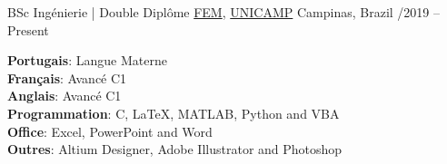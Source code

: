 \documentclass[10pt, a4paper]{extarticle}
\begin{document}
\headedsection
    {BSc Ingénierie | Double Diplôme}
    {\textsc{}}
    {
        \headedsubsection
        {\href{https://www.fem.unicamp.br/index.php/pt-br/}{FEM}, \href{https://www.unicamp.br/unicamp/universidade}{UNICAMP}}
        {Campinas, Brazil /2019 -- Present}
        {}
    }


\vspace{6mm}
\begin{multicols}{2}
    \vspace{2mm}
    \textbf{Portugais}: Langue Materne\\
    \textbf{Français}: Avancé C1\\
    \textbf{Anglais}: Avancé C1\\
    \columnbreak
    \vspace{2mm}
    \textbf{Programmation}: C, LaTeX, MATLAB, Python and VBA\\
    \textbf{Office}: Excel, PowerPoint and Word\\
    \textbf{Outres}: Altium Designer, Adobe Illustrator and Photoshop\\
\end{multicols}
\end{document}
